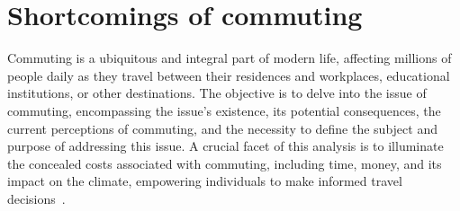 \section{Shortcomings of commuting}\label{sec:shortcomings-of-commuting}

Commuting is a ubiquitous and integral part of modern life, affecting millions of people daily as they travel between
their residences and workplaces, educational institutions, or other destinations.
The objective is to delve into the issue of commuting, encompassing the issue's existence, its potential consequences,
the current perceptions of commuting, and the necessity to define the subject and purpose of addressing this issue.
A crucial facet of this analysis is to illuminate the concealed costs associated with commuting, including time, money,
and its impact on the climate, empowering individuals to make informed travel decisions~\cite{alma9921355859805762}.

